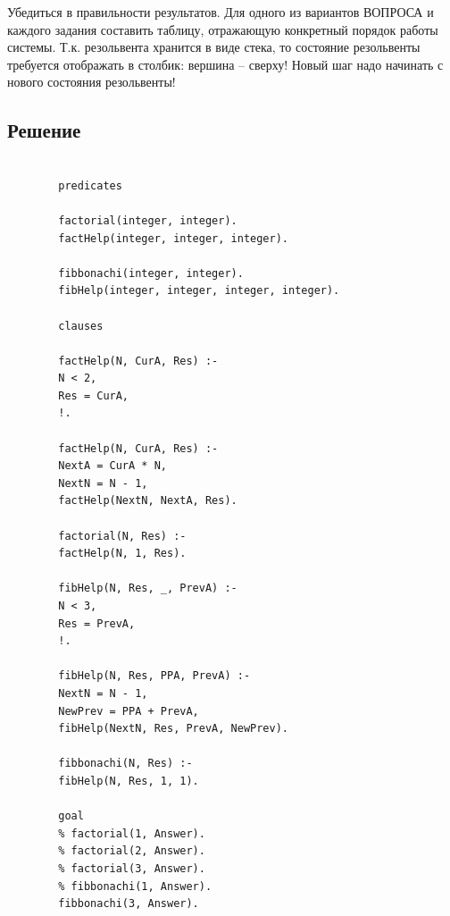 \documentclass[12pt]{report}
\begin{document}
	Убедиться в правильности результатов.
	Для одного из вариантов ВОПРОСА и каждого задания составить таблицу, отражающую конкретный порядок работы системы. Т.к. резольвента хранится в виде стека, то состояние резольвенты требуется отображать в столбик: вершина – сверху! Новый шаг надо начинать с нового состояния резольвенты!
	
	
	\subsection*{Решение}
	\begin{lstlisting}
		
		predicates
		
		factorial(integer, integer).
		factHelp(integer, integer, integer).
		
		fibbonachi(integer, integer).
		fibHelp(integer, integer, integer, integer).
		
		clauses
		
		factHelp(N, CurA, Res) :- 
		N < 2, 
		Res = CurA, 
		!.
		
		factHelp(N, CurA, Res) :-
		NextA = CurA * N,
		NextN = N - 1,
		factHelp(NextN, NextA, Res).
		
		factorial(N, Res) :-
		factHelp(N, 1, Res).
		
		fibHelp(N, Res, _, PrevA) :- 
		N < 3, 
		Res = PrevA, 
		!.
		
		fibHelp(N, Res, PPA, PrevA) :-
		NextN = N - 1,
		NewPrev = PPA + PrevA,
		fibHelp(NextN, Res, PrevA, NewPrev).
		
		fibbonachi(N, Res) :- 
		fibHelp(N, Res, 1, 1).
		
		goal
		% factorial(1, Answer).
		% factorial(2, Answer).
		% factorial(3, Answer).
		% fibbonachi(1, Answer).
		fibbonachi(3, Answer).
		
	\end{lstlisting}
	
	
	
	
\end{document}
